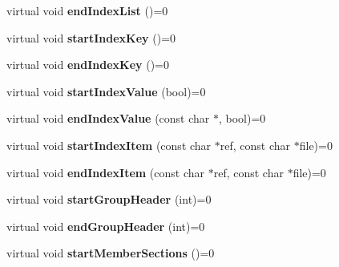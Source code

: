 \begin{DoxyCompactItemize}
\item 
\hypertarget{class_output_generator_a1377e470a5f2972f35a89239ba34221d}{virtual void {\bfseries end\-Index\-List} ()=0}\label{class_output_generator_a1377e470a5f2972f35a89239ba34221d}

\item 
\hypertarget{class_output_generator_a4f3838b3a6b0d2594a0d93ba00312617}{virtual void {\bfseries start\-Index\-Key} ()=0}\label{class_output_generator_a4f3838b3a6b0d2594a0d93ba00312617}

\item 
\hypertarget{class_output_generator_aaed675ff16608b70d75adb554658d56e}{virtual void {\bfseries end\-Index\-Key} ()=0}\label{class_output_generator_aaed675ff16608b70d75adb554658d56e}

\item 
\hypertarget{class_output_generator_a2be3dc0cff541cdce435b8d613d85c4b}{virtual void {\bfseries start\-Index\-Value} (bool)=0}\label{class_output_generator_a2be3dc0cff541cdce435b8d613d85c4b}

\item 
\hypertarget{class_output_generator_a5d95cb9cf1cb6e9563db7604e5c4995e}{virtual void {\bfseries end\-Index\-Value} (const char $\ast$, bool)=0}\label{class_output_generator_a5d95cb9cf1cb6e9563db7604e5c4995e}

\item 
\hypertarget{class_output_generator_aecb6d3a0bdd5c905d97002b6915c9cbb}{virtual void {\bfseries start\-Index\-Item} (const char $\ast$ref, const char $\ast$file)=0}\label{class_output_generator_aecb6d3a0bdd5c905d97002b6915c9cbb}

\item 
\hypertarget{class_output_generator_ac20769a9985e386a216cebb88b95d848}{virtual void {\bfseries end\-Index\-Item} (const char $\ast$ref, const char $\ast$file)=0}\label{class_output_generator_ac20769a9985e386a216cebb88b95d848}

\item 
\hypertarget{class_output_generator_a644d6a8510261196929fdb74dff3d535}{virtual void {\bfseries start\-Group\-Header} (int)=0}\label{class_output_generator_a644d6a8510261196929fdb74dff3d535}

\item 
\hypertarget{class_output_generator_af5bd29ba793df68e8992476fafe8a0ce}{virtual void {\bfseries end\-Group\-Header} (int)=0}\label{class_output_generator_af5bd29ba793df68e8992476fafe8a0ce}

\item 
\hypertarget{class_output_generator_a010d590ae7589a13307b985324ba5c1c}{virtual void {\bfseries start\-Member\-Sections} ()=0}\label{class_output_generator_a010d590ae7589a13307b985324ba5c1c}


\end{DoxyCompactItemize}
